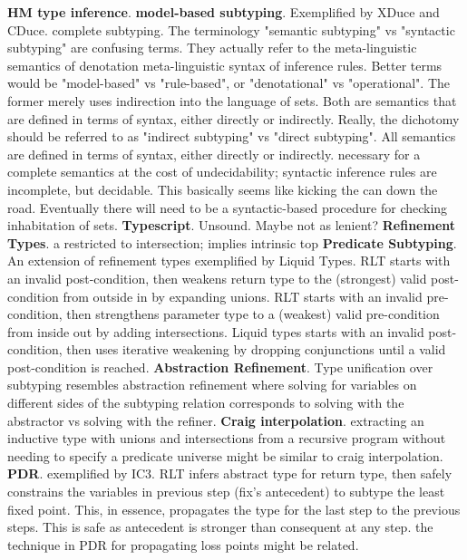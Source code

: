 \documentclass[letterpaper]{llncs}
\begin{document}
\textbf{HM type inference}.  \newline
\textbf{model-based subtyping}. Exemplified by XDuce and CDuce. complete subtyping.
The terminology "semantic subtyping" vs "syntactic subtyping" are confusing terms. 
They actually refer to the meta-linguistic semantics of denotation 
meta-linguistic syntax of inference rules.
Better terms would be "model-based" vs "rule-based", or "denotational" vs "operational".
The former merely uses indirection into the language of sets.
Both are semantics that are defined in terms of syntax, either directly or indirectly.
Really, the dichotomy should be referred to as "indirect subtyping" vs "direct subtyping".
All semantics are defined in terms of syntax, either directly or indirectly. 
necessary for a complete semantics at the cost of undecidability; syntactic inference rules are incomplete, but decidable.
This basically seems like kicking the can down the road. Eventually there will need to be 
a syntactic-based procedure for checking inhabitation of sets.
\newline
\textbf{Typescript}. Unsound. Maybe not as lenient?  \newline
\textbf{Refinement Types}. a restricted to intersection; implies intrinsic top\newline
\textbf{Predicate Subtyping}. An extension of refinement types exemplified by Liquid Types.
RLT starts with an invalid post-condition, then weakens return type to the (strongest) valid post-condition from outside in by expanding unions. 
RLT starts with an invalid pre-condition, then strengthens parameter type to a (weakest) valid pre-condition from inside out by adding intersections. 
Liquid types starts with an invalid post-condition, then uses iterative weakening by dropping conjunctions until a valid post-condition is reached.
\newline
\textbf{Abstraction Refinement}. Type unification over subtyping resembles abstraction refinement  
where solving for variables on different sides of the subtyping relation corresponds to
solving with the abstractor vs solving with the refiner.
\newline
\textbf{Craig interpolation}. extracting an inductive type with unions and intersections 
from a recursive program without needing to specify a predicate universe might be similar to
craig interpolation. \newline
\textbf{PDR}. exemplified by IC3. RLT infers abstract type for return type, 
then safely constrains the variables in previous step (fix's antecedent) to subtype the least fixed point.
This, in essence, propagates the type for the last step to the previous steps.
This is safe as antecedent is stronger than consequent at any step.
the technique in PDR for propagating loss points might be related. 
 \newline 
\end{document}
